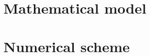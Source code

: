 \documentclass[twoside]{article}
\begin{document}
\section{Mathematical model}







\section{Numerical scheme}








\end{document}
